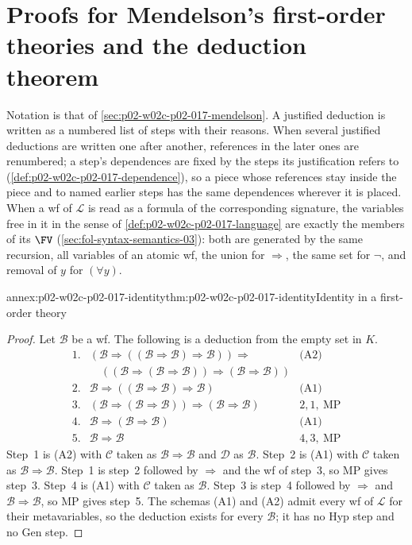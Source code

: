 \section{Proofs for Mendelson's first-order theories and the deduction theorem}
\label{sec:annex-p02-w02c-p02-017-mendelson}

Notation is that of \cref{sec:p02-w02c-p02-017-mendelson}.  A justified
deduction is written as a numbered list of steps with their reasons.  When
several justified deductions are written one after another, references in the
later ones are renumbered; a step's dependences are fixed by the steps its
justification refers to (\cref{def:p02-w02c-p02-017-dependence}), so a piece
whose references stay inside the piece and to named earlier steps has the
same dependences wherever it is placed.  When a wf of \(\mathscr L\) is read as
a formula of the corresponding signature, the variables free in it in the
sense of \cref{def:p02-w02c-p02-017-language} are exactly the members of its
\(\FV\) (\cref{sec:fol-syntax-semantics-03}): both are generated by the same
recursion, all variables of an atomic
wf, the union for \(\Rightarrow\), the same set for \(\neg\), and removal of
\(y\) for \((\forall y)\).

\begin{annexitem}{annex:p02-w02c-p02-017-identity}{thm:p02-w02c-p02-017-identity}{Identity in a first-order theory}
\begin{proof}
Let \(\mathscr B\) be a wf.  The following is a deduction from the empty set
in \(K\).
\[
\begin{array}{rll}
 1. & (\mathscr B\Rightarrow((\mathscr B\Rightarrow\mathscr B)
       \Rightarrow\mathscr B))\Rightarrow{} & \text{(A2)}\\
    & \quad((\mathscr B\Rightarrow(\mathscr B\Rightarrow\mathscr B))
       \Rightarrow(\mathscr B\Rightarrow\mathscr B)) & \\
 2. & \mathscr B\Rightarrow((\mathscr B\Rightarrow\mathscr B)
       \Rightarrow\mathscr B) & \text{(A1)}\\
 3. & (\mathscr B\Rightarrow(\mathscr B\Rightarrow\mathscr B))
       \Rightarrow(\mathscr B\Rightarrow\mathscr B) & 2,1,\ \text{MP}\\
 4. & \mathscr B\Rightarrow(\mathscr B\Rightarrow\mathscr B) & \text{(A1)}\\
 5. & \mathscr B\Rightarrow\mathscr B & 4,3,\ \text{MP}
\end{array}
\]
Step~1 is (A2) with \(\mathscr C\) taken as
\(\mathscr B\Rightarrow\mathscr B\) and \(\mathscr D\) as \(\mathscr B\).
Step~2 is (A1) with \(\mathscr C\) taken as
\(\mathscr B\Rightarrow\mathscr B\).  Step~1 is step~2 followed by
\(\Rightarrow\) and the wf of step~3, so MP gives step~3.  Step~4 is (A1) with
\(\mathscr C\) taken as \(\mathscr B\).  Step~3 is step~4 followed by
\(\Rightarrow\) and \(\mathscr B\Rightarrow\mathscr B\), so MP gives step~5.
The schemas (A1) and (A2) admit every wf of \(\mathscr L\) for their
metavariables, so the deduction exists for every \(\mathscr B\); it has no Hyp
step and no Gen step.
\end{proof}
\end{annexitem}

